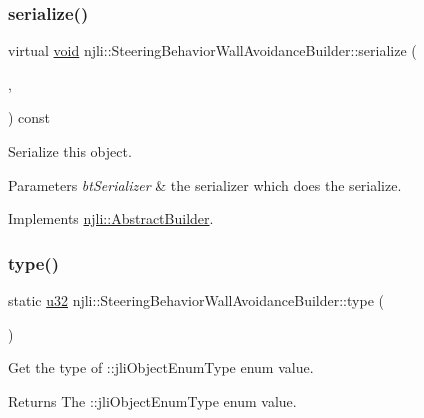 \subsubsection{\texorpdfstring{serialize()}{serialize()}}
{\footnotesize\ttfamily virtual \mbox{\hyperlink{_thread_8h_af1e856da2e658414cb2456cb6f7ebc66}{void}} njli\+::\+Steering\+Behavior\+Wall\+Avoidance\+Builder\+::serialize (\begin{DoxyParamCaption}\item[{\mbox{\hyperlink{_thread_8h_af1e856da2e658414cb2456cb6f7ebc66}{void}} $\ast$}]{,  }\item[{bt\+Serializer $\ast$}]{ }\end{DoxyParamCaption}) const\hspace{0.3cm}{\ttfamily [virtual]}}

Serialize this object.


\begin{DoxyParams}{Parameters}
{\em bt\+Serializer} & the serializer which does the serialize. \\
\hline
\end{DoxyParams}


Implements \mbox{\hyperlink{classnjli_1_1_abstract_builder_ab66b774e02ccb9da554c9aab7fa6d981}{njli\+::\+Abstract\+Builder}}.

\mbox{\label{classnjli_1_1_steering_behavior_wall_avoidance_builder_aaddd874a7c8b297e77bff4ff61a19da3}} 
\subsubsection{\texorpdfstring{type()}{type()}}
{\footnotesize\ttfamily static \mbox{\hyperlink{_util_8h_a10e94b422ef0c20dcdec20d31a1f5049}{u32}} njli\+::\+Steering\+Behavior\+Wall\+Avoidance\+Builder\+::type (\begin{DoxyParamCaption}{ }\end{DoxyParamCaption})\hspace{0.3cm}{\ttfamily [static]}}

Get the type of \+::jli\+Object\+Enum\+Type enum value.

\begin{DoxyReturn}{Returns}
The \+::jli\+Object\+Enum\+Type enum value. 
\end{DoxyReturn}



